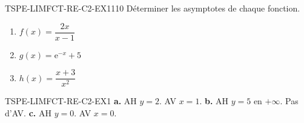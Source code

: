 

\begin{exercice}{TSPE-LIMFCT-RE-C2-EX1}{1}{10}
Déterminer les asymptotes de chaque fonction.
\begin{enumerate}
  \item $f(x) = \dfrac{2x}{x-1}$
  \item $g(x) = \mathrm{e}^{-x} + 5$
  \item $h(x) = \dfrac{x+3}{x^2}$
\end{enumerate}
\end{exercice}


\begin{corrige}{TSPE-LIMFCT-RE-C2-EX1}
\textbf{a.} AH $y = 2$. AV $x = 1$. \quad \textbf{b.} AH $y = 5$ en $+\infty$. Pas d'AV. \quad \textbf{c.} AH $y = 0$. AV $x = 0$.
\end{corrige}
